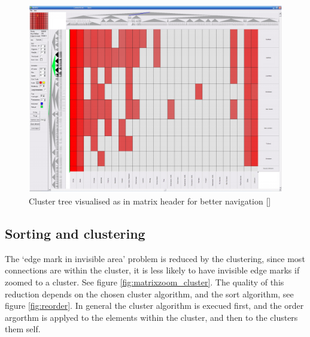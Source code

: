 \begin{figure}[h]
\centering
\includegraphics[width=\textwidth]{images/matrixzoom_abello}
\caption{Cluster tree visualised as in matrix header for better navigation [\cite{abello}] \label{fig:matrixzoom_abello}}
\end{figure}





\subsection{Sorting and clustering}   

The ‘edge mark in invisible area' problem is reduced by the clustering, since most connections are within the cluster, it is less likely to have invisible edge marks if zoomed to a cluster. See figure \ref{fig:matrixzoom_cluster}. 
The quality of this reduction depends on the chosen cluster algorithm, and the sort algorithm, see figure \ref{fig:reorder}. In general the cluster algorithm is execued first, and the order argorthm is applyed to the elements within the cluster, and then to the clusters them self.

